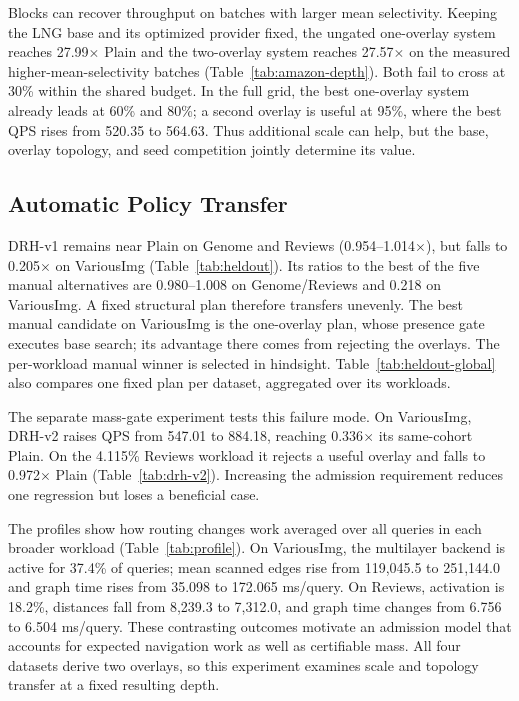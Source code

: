 Blocks can recover throughput on batches with larger mean selectivity. Keeping the LNG base
and its optimized provider fixed, the ungated one-overlay system reaches
27.99$\times$ Plain and the two-overlay system reaches 27.57$\times$ on
the measured higher-mean-selectivity batches (Table~\ref{tab:amazon-depth}). Both fail
to cross at 30\% within the shared budget. In the full grid, the best
one-overlay system already leads at 60\% and 80\%; a second overlay is
useful at 95\%, where the best QPS rises from 520.35 to 564.63.
Thus additional scale can help, but the base, overlay topology, and seed
competition jointly determine its value.

\subsection{Automatic Policy Transfer}
\authoritativePolicyResults
DRH-v1 remains near Plain on Genome and Reviews (0.954--1.014$\times$),
but falls to 0.205$\times$ on VariousImg (Table~\ref{tab:heldout}). Its
ratios to the best of the five manual alternatives are 0.980--1.008 on
Genome/Reviews and 0.218 on VariousImg. A fixed structural plan therefore
transfers unevenly. The best manual candidate on VariousImg is the
one-overlay plan, whose presence gate executes base search; its advantage
there comes from rejecting the overlays.
The per-workload manual winner is selected in hindsight. Table~\ref{tab:heldout-global}
also compares one fixed plan per dataset, aggregated over its workloads.

The separate mass-gate experiment tests this failure mode. On VariousImg,
DRH-v2 raises QPS from 547.01 to 884.18, reaching 0.336$\times$ its
same-cohort Plain. On the 4.115\% Reviews workload it rejects a useful
overlay and falls to 0.972$\times$ Plain (Table~\ref{tab:drh-v2}).
Increasing the admission requirement reduces one regression but loses a
beneficial case.

The profiles show how routing changes work averaged over all queries
in each broader workload (Table~\ref{tab:profile}). On VariousImg, the multilayer backend is
active for 37.4\% of queries; mean scanned edges rise from 119,045.5 to
251,144.0 and graph time rises from 35.098 to 172.065 ms/query. On Reviews,
activation is 18.2\%, distances fall from 8,239.3 to 7,312.0, and graph time
changes from 6.756 to 6.504 ms/query. These contrasting outcomes motivate
an admission model that accounts for expected navigation work as well as
certifiable mass. All four datasets derive two overlays, so this experiment
examines scale and topology transfer at a fixed resulting depth.

